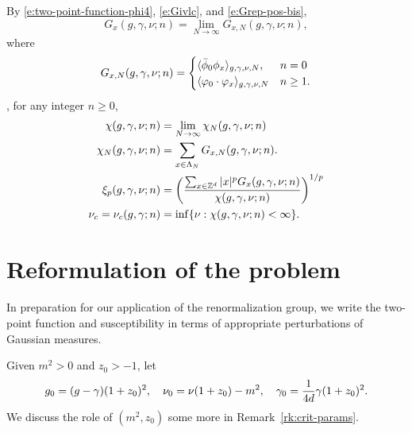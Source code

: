 By \eqref{e:two-point-function-phi4}, \eqref{e:Givlc}, and \eqref{e:Grep-pos-bis},
\begin{equation}
G_x(g, \gamma, \nu; n) = \lim_{N\to\infty} G_{x,N}(g, \gamma, \nu; n),
\end{equation}
where
\begin{equation}
G_{x,N}(g, \gamma, \nu; n)
	=
\begin{cases}
\langle \bar\phi_0 \phi_x \rangle_{g,\gamma,\nu,N},      & n = 0 \\
\langle \varphi_0 \cdot \varphi_x \rangle_{g,\gamma,\nu,N}  & n \ge 1.
\end{cases}
\end{equation}
,
for any integer $n \ge 0$,
\begin{align}
\label{e:chilim}
\chi(g, \gamma, \nu; n)
	&= \lim_{N\rightarrow\infty} \chi_N(g, \gamma, \nu; n) \\
\label{e:chiNdef}
\chi_N(g, \gamma, \nu; n)
	&= \sum_{x\in\Lambda_N} G_{x,N}(g, \gamma, \nu; n). \\
\label{e:clp}
\xi_p(g, \gamma, \nu; n)
	&= \left(\frac{\sum_{x\in{ {{\mathbb Z}}^d }} |x|^p G_x(g, \gamma, \nu; n)}{\chi(g, \gamma, \nu; n)}\right)^{1/p} \\
\label{e:nuc-def}
\nu_c
	= \nu_c(g, \gamma; n) &= \inf \{ \nu : \chi(g, \gamma, \nu; n) < \infty \}.
\end{align}


\section{Reformulation of the problem}
\label{sec:reformulation}

In preparation for our application of the renormalization group, we write the
two-point function and susceptibility in terms of appropriate perturbations of
Gaussian measures.

Given $m^2>0$ and $z_0 > -1$, let
\begin{equation}
\label{e:gg0}
g_0 = (g - \gamma) (1 + z_0)^2,
	\quad
\nu_0 = \nu (1 + z_0) - m^2,
	\quad
\gamma_0 = \frac{1}{4d} \gamma (1 + z_0)^2.
\end{equation}
We discuss the role of $(m^2, z_0)$ some more in Remark~\ref{rk:crit-params}.

